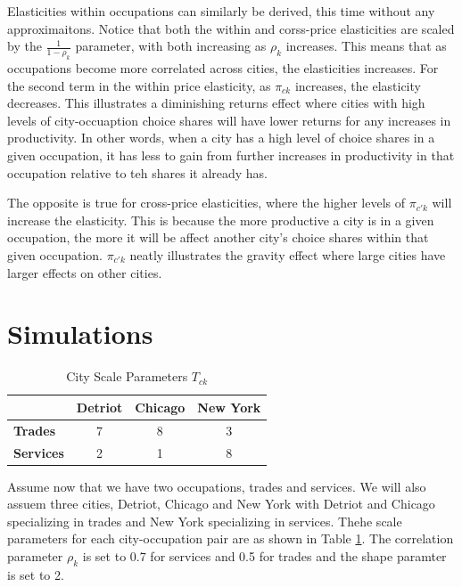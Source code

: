 \documentclass[10pt]{article}
\begin{document}
Elasticities within occupations can similarly be derived, this time without any approximaitons. Notice that both the within and corss-price elasticities are scaled by the $\frac{1}{1 - \rho_k}$ parameter, with both increasing as $\rho_k$ increases. This means that as occupations become more correlated across cities, the elasticities increases. For the second term in the within price elasticity, as $\pi_{ck}$ increases, the elasticity decreases. This illustrates a diminishing returns effect where cities with high levels of city-occuaption choice shares will have lower returns for any increases in productivity. In other words, when a city has a high level of choice shares in a given occupation, it has less to gain from further increases in productivity in that occupation relative to teh shares it already has.

The opposite is true for cross-price elasticities, where the higher levels of $\pi_{c'k}$ will increase the elasticity. This is because the more productive a city is in a given occupation, the more it will be affect another city's choice shares within that given occupation. $\pi_{c'k}$ neatly illustrates the gravity effect where large cities have larger effects on other cities.

\section{Simulations}

\begin{table}[h]
    \centering
    \begin{tabular}{|l|c|c|c|}
        \hline
                          & \textbf{Detriot} & \textbf{Chicago} & \textbf{New York} \\
        \hline
        \textbf{Trades}   & 7                & 8                & 3                 \\
        \hline
        \textbf{Services} & 2                & 1                & 8                 \\
        \hline
    \end{tabular}
    \caption{City Scale Parameters $T_{ck}$}
    \label{city_shifter}
\end{table}

Assume now that we have two occupations, trades and services. We will also assuem three cities, Detriot, Chicago and New York with Detriot and Chicago specializing in trades and New York specializing in services. Thehe scale parameters for each city-occupation pair are as shown in Table \ref{city_shifter}. The correlation parameter $\rho_k$ is set to 0.7 for services and 0.5 for trades and the shape paramter is set to 2.
\end{document}
